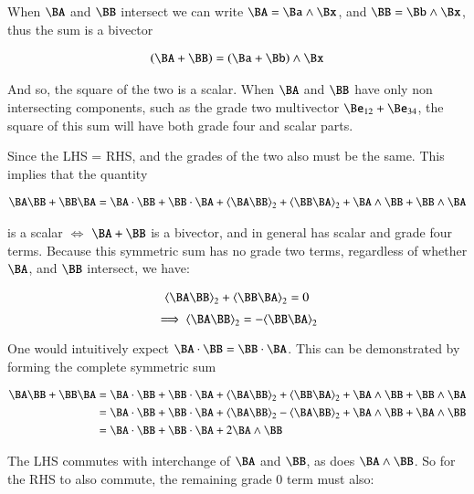 When $\BA$ and $\BB$ intersect we can write $\BA = \Ba \wedge \Bx$, and $\BB = \Bb \wedge \Bx$, thus the sum is a bivector

\begin{align*}
(\BA + \BB)
= (\Ba + \Bb) \wedge \Bx
\end{align*}

And so, the square of the two is a scalar.  When $\BA$ and $\BB$ have only non intersecting components, such as the grade two  multivector $\Be_{12} + \Be_{34}$, the square of this sum will have both grade four and scalar parts.

Since the LHS = RHS, and the grades of the two also must be the same.  This implies that the quantity

\begin{align*}
\BA \BB + \BB \BA = 
\BA \cdot \BB + \BB \cdot \BA
+\gpgradetwo{\BA \BB} + \gpgradetwo{\BB \BA}
+\BA \wedge \BB + \BB \wedge \BA
\end{align*}

is a scalar $\iff$ $\BA + \BB$ is a bivector, and in general has scalar and grade four terms.  Because this symmetric sum has no grade two terms, regardless of whether $\BA$, and $\BB$ intersect, we have:

\begin{align*}
\gpgradetwo{\BA \BB} + \gpgradetwo{\BB \BA} = 0
\end{align*}
\begin{equation}\label{eqn:bivector:signgradetwo}
\implies
\gpgradetwo{\BA \BB} = -\gpgradetwo{\BB \BA}
\end{equation}

One would intuitively expect $\BA \cdot \BB = \BB \cdot \BA$.  This can be demonstrated by forming the complete symmetric sum

\begin{align*}
\BA \BB + \BB \BA 
&= 
{\BA \cdot \BB} +{\BB \cdot \BA}
+\gpgrade{\BA \BB}{2} +\gpgrade{\BB \BA}{2}
+{\BA \wedge \BB} + {\BB \wedge \BA} \\
&= 
{\BA \cdot \BB} +{\BB \cdot \BA}
+\gpgrade{\BA \BB}{2} -\gpgrade{\BA \BB}{2}
+{\BA \wedge \BB} + {\BA \wedge \BB} \\
&= 
{\BA \cdot \BB} +{\BB \cdot \BA}
+2{\BA \wedge \BB} \\
\end{align*}

The LHS commutes with interchange of $\BA$ and $\BB$, as does ${\BA \wedge \BB}$.  So for the RHS to also commute, the remaining grade 0 term must also:

